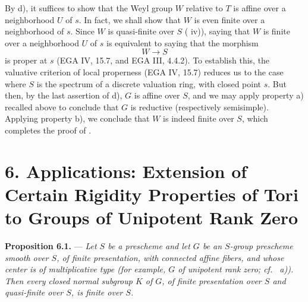 By  d), it suffices to show that the Weyl group \(W\) relative
to \(T\) is affine over a neighborhood \(U\) of \(s\). In fact,
we shall show that \(W\) is even finite over a neighborhood of
\(s\). Since \(W\) is quasi-finite over \(S\) ( iv)), saying that \(W\) is finite over a neighborhood \(U\)
of \(s\) is equivalent to saying that the morphism
\[
  W\longrightarrow S
\]
is proper at \(s\) (EGA IV, 15.7, and EGA III, 4.4.2). To
establish this, the valuative criterion of local properness
(EGA IV, 15.7) reduces us to the case where \(S\) is the spectrum
of a discrete valuation ring, with closed point \(s\). But then,
by the last assertion of  d), \(G\) is affine over \(S\), and
we may apply property a) recalled above to conclude that \(G\) is
reductive (respectively semisimple). Applying property b), we
conclude that \(W\) is indeed finite over \(S\), which completes
the proof of .



%
\section*{6. Applications: Extension of Certain Rigidity Properties
of Tori to Groups of Unipotent Rank Zero}

\noindent{}%
\textbf{Proposition 6.1.} --- \textit{Let \(S\) be a prescheme and
let \(G\) be an \(S\)-group prescheme smooth over \(S\), of finite
presentation, with connected affine fibers, and whose center is of
multiplicative type (for example, \(G\) of unipotent rank zero;
cf.\  a)). Then every closed normal subgroup \(K\) of \(G\),
of finite presentation over \(S\) and quasi-finite over \(S\), is
finite over \(S\).}


